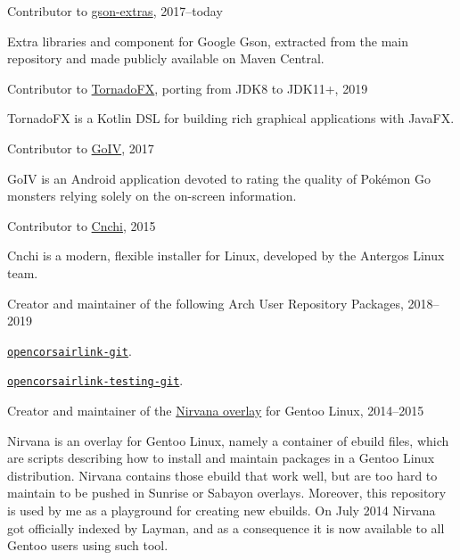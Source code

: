 \documentclass[10pt]{article}
\newenvironment{innerlist}[1][\enskip\textbullet]%
        {\begin{compactitem}[#1]}{\end{compactitem}}
\newcommand{\halfblankline}{\quad\vspace{-0.5\baselineskip}\pagebreak[3]}
\begin{document}
Contributor to \href{https://github.com/DanySK/gson-extras}{gson-extras}, 2017--today
\begin{innerlist}
    \item Extra libraries and component for Google Gson, extracted from the main repository and made publicly available on Maven Central.
\end{innerlist}
\halfblankline

Contributor to \href{https://github.com/edvin/tornadofx}{TornadoFX}, porting from JDK8 to JDK11+, 2019
\begin{innerlist}
    \item TornadoFX is a Kotlin DSL for building rich graphical applications with JavaFX.
\end{innerlist}
\halfblankline

Contributor to \href{https://github.com/farkam135/GoIV}{GoIV}, 2017
\begin{innerlist}
    \item GoIV is an Android application devoted to rating the quality of Pokémon Go monsters relying solely on the on-screen information.
\end{innerlist}
\halfblankline

Contributor to \href{https://github.com/Antergos/Cnchi}{Cnchi}, 2015
\begin{innerlist}
    \item Cnchi is a modern, flexible installer for Linux, developed by the Antergos Linux team.
\end{innerlist}
\halfblankline

Creator and maintainer of the following Arch User Repository Packages, 2018--2019
\begin{innerlist}
    \item \href{https://aur.archlinux.org/packages/opencorsairlink-git/}{\texttt{opencorsairlink-git}}.
    \item \href{https://aur.archlinux.org/packages/opencorsairlink-testing-git/}{\texttt{opencorsairlink-testing-git}}.
\end{innerlist}
\halfblankline

Creator and maintainer of the \href{https://bitbucket.org/danysk/nirvana-overlay/}{Nirvana overlay} for Gentoo Linux, 2014--2015
\begin{innerlist}
    \item Nirvana is an overlay for Gentoo Linux, namely a container of ebuild files, which are scripts describing how to install and maintain packages in a Gentoo Linux distribution. Nirvana contains those ebuild that work well, but are too hard to maintain to be pushed in Sunrise or Sabayon overlays. Moreover, this repository is used by me as a playground for creating new ebuilds. On July 2014 Nirvana got officially indexed by Layman, and as a consequence it is now available to all Gentoo users using such tool.
\end{innerlist}
\halfblankline
\end{document}
